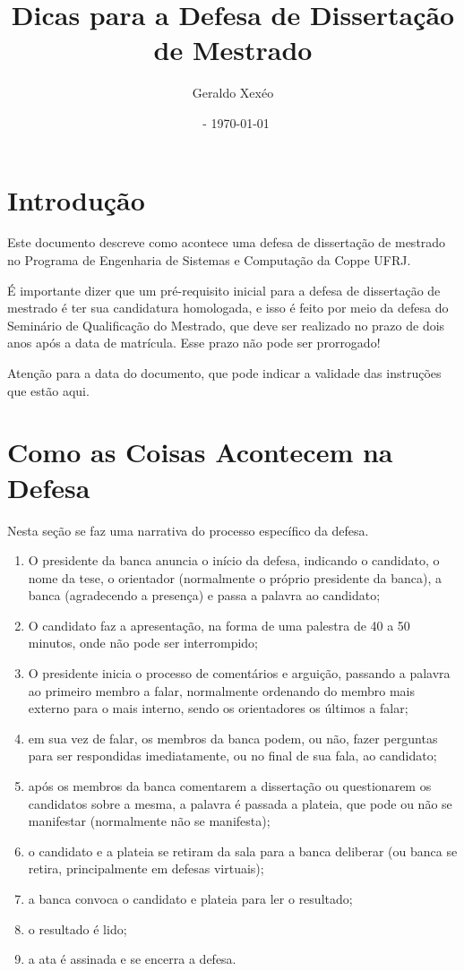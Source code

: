 \documentclass[a4paper,12pt]{article}
\title{Dicas para a Defesa de Dissertação de Mestrado}
\author{Geraldo Xexéo}
\affil{\url{xexeo@ufrj.br} \\
\url{http://xexeo.net}}
\date{\ccbyncsa\  - \today}
\begin{document}
\maketitle

\section{Introdução}

Este documento descreve como acontece uma defesa de dissertação de mestrado no Programa de Engenharia de Sistemas e Computação da Coppe UFRJ.

É importante dizer que um pré-requisito inicial para a defesa de dissertação de mestrado é ter sua candidatura homologada, e isso é feito por meio da defesa do Seminário de Qualificação do Mestrado, que deve ser realizado no prazo de dois anos após a data de matrícula. Esse prazo não pode ser prorrogado!

Atenção para a data do documento, que pode indicar a validade das instruções que estão aqui.

\section{Como as Coisas Acontecem na Defesa}

Nesta seção se faz uma narrativa do processo específico da defesa.

\begin{enumerate}
    \item O presidente da banca anuncia o início da defesa, indicando o candidato, o nome da tese, o orientador (normalmente o próprio presidente da banca), a banca (agradecendo a presença) e passa a palavra ao candidato;
    \item O candidato faz a apresentação, na forma de uma palestra de 40 a 50 minutos, onde não pode ser interrompido;
    \item O presidente inicia o processo de comentários e arguição, passando a palavra ao primeiro membro a falar, normalmente ordenando do membro mais externo para o mais interno, sendo os orientadores os últimos a falar;
    \item em sua vez de falar, os membros da banca podem, ou não, fazer perguntas para ser respondidas imediatamente, ou no final de sua fala, ao candidato;
    \item após os membros da banca comentarem a dissertação ou questionarem os candidatos sobre a mesma, a palavra é passada a plateia, que pode ou não se manifestar (normalmente não se manifesta);
    \item o candidato e a plateia se retiram da sala para a banca deliberar (ou banca se retira, principalmente em defesas virtuais);
    \item a banca convoca o candidato e plateia para ler o resultado;
    \item o resultado é lido;
    \item a ata é assinada e se encerra a defesa.
\end{enumerate}
\end{document}
